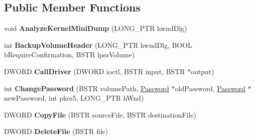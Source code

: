 \subsection*{Public Member Functions}
\begin{DoxyCompactItemize}
\item 
\mbox{\label{interface_gost_crypt_main_com_1_1_i_gost_crypt_main_com_a570fea814d627064ff569829c47cdb64}} 
void {\bfseries Analyze\+Kernel\+Mini\+Dump} (L\+O\+N\+G\+\_\+\+P\+TR hwnd\+Dlg)
\item 
\mbox{\label{interface_gost_crypt_main_com_1_1_i_gost_crypt_main_com_ae58b08a19b63203f95af3e4c768a2e11}} 
int {\bfseries Backup\+Volume\+Header} (L\+O\+N\+G\+\_\+\+P\+TR hwnd\+Dlg, B\+O\+OL b\+Require\+Confirmation, B\+S\+TR lpsz\+Volume)
\item 
\mbox{\label{interface_gost_crypt_main_com_1_1_i_gost_crypt_main_com_a8be1814482b71622f18e80e1b39b8ae7}} 
D\+W\+O\+RD {\bfseries Call\+Driver} (D\+W\+O\+RD ioctl, B\+S\+TR input, B\+S\+TR $\ast$output)
\item 
\mbox{\label{interface_gost_crypt_main_com_1_1_i_gost_crypt_main_com_afb8a44cb4f5d8c4f36e36f5c6da21d45}} 
int {\bfseries Change\+Password} (B\+S\+TR volume\+Path, \hyperlink{struct_password}{Password} $\ast$old\+Password, \hyperlink{struct_password}{Password} $\ast$new\+Password, int pkcs5, L\+O\+N\+G\+\_\+\+P\+TR h\+Wnd)
\item 
\mbox{\label{interface_gost_crypt_main_com_1_1_i_gost_crypt_main_com_a918308096db201bceda28b68e973526d}} 
D\+W\+O\+RD {\bfseries Copy\+File} (B\+S\+TR source\+File, B\+S\+TR destination\+File)
\item 
\mbox{\label{interface_gost_crypt_main_com_1_1_i_gost_crypt_main_com_acd28814d533541b5b3081c5e9d18f2cc}} 
D\+W\+O\+RD {\bfseries Delete\+File} (B\+S\+TR file)
\item 
\mbox{\label{interface_gost_crypt_main_com_1_1_i_gost_crypt_main_com_aa9563b672843083c2ecbdbd883d741e3}} 

\end{DoxyCompactItemize}
